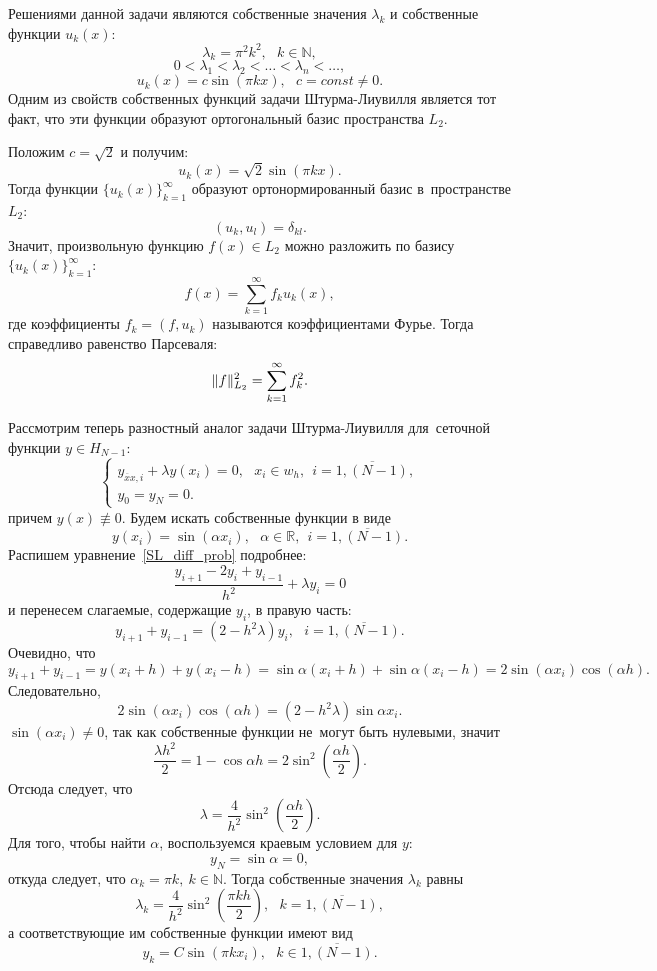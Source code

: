 \documentclass[11pt,a4paper,twoside]{report}
\numberwithin{equation}{section}
\theoremstyle{definition}
\theoremstyle{plain}
\DeclarePairedDelimiter\norm{\lVert}{\rVert}
\begin{document}
Решениями данной задачи являются собственные значения $\lambda_k$ и собственные
функции $u_k(x)$:
%
$$
    \lambda_k = \pi^2k^2, ~~~k\in\mathbb{N},
$$
%
$$
    0 < \lambda_1 < \lambda_2 < \ldots < \lambda_n < \ldots,
$$
%
$$
    u_k(x) = c \sin(\pi k x), ~~~c = const \neq 0.
$$
%
Одним из свойств собственных функций задачи Штурма-Лиувилля
является тот факт, что эти функции образуют ортогональный базис
пространства $L_2$.

Положим $c = \sqrt{2}$ и получим:
%
$$
    u_k(x) = \sqrt{2}\sin(\pi kx).
$$
%
Тогда функции $\{u_k(x)\}_{k=1}^{\infty}$ образуют ортонормированный
базис в~пространстве $L_2$:
%
$$
    (u_k, u_l) = \delta_{kl}.
$$
%
Значит, произвольную функцию $f(x) \in L_2$ можно разложить по базису
$\{u_k(x)\}_{k=1}^{\infty}$:
%
$$
    f(x) = \sum_{k=1}^{\infty} f_k u_k(x),
$$
%
где коэффициенты $f_k = (f,u_k)$ называются коэффициентами Фурье.
Тогда справедливо равенство Парсеваля:
%
$$
    \norm{f}_{L_2}^2 = \sum_{k=1}^{\infty} f_k^2.
$$
%

Рассмотрим теперь разностный аналог задачи Штурма-Лиувилля для~сеточной
функции $y\in H_{N-1}$:
%
\begin{equation}
%
    \begin{cases}
        \label{SL_diff_prob}
        y_{\overline{x}x,i} + \lambda y(x_i) = 0,
        ~~~x_i \in w_h, ~~i=\overline{1, (N-1)}, \\
        y_0 = y_N = 0.
    \end{cases}
%
\end{equation}
%
причем $y(x) \not\equiv 0.$
Будем искать собственные функции в виде
%
$$
    y(x_i) = \sin(\alpha x_i), ~~~\alpha\in\mathbb{R}, ~~i=\overline{1, (N-1)}.
$$
%
Распишем уравнение~\eqref{SL_diff_prob} подробнее:
%
$$
    \frac{y_{i+1} - 2y_i + y_{i-1}}{h^2} + \lambda y_i = 0
$$
%
и перенесем слагаемые, содержащие $y_i$, в правую часть:
%
$$
    y_{i+1} + y_{i-1} = \left(2 - h^2\lambda\right)y_i, ~~~i = \overline{1, (N-1)}.
$$
%
Очевидно, что
%
$$
    y_{i+1} + y_{i-1} = y(x_i + h) + y(x_i - h) = \sin\alpha(x_i + h) +
    \sin\alpha(x_i - h) = 2\sin(\alpha x_i) \cos(\alpha h).
$$
%
Следовательно,
%
$$
    2\sin(\alpha x_i) \cos(\alpha h) = (2 - h^2\lambda) \sin\alpha x_i.
$$
%
$\sin(\alpha x_i) \neq 0$, так как собственные функции
не~могут быть нулевыми, значит
%
$$
    \frac{\lambda h^2}{2} = 1 - \cos \alpha h =
    2 \sin^2\left(\frac{\alpha h}{2}\right).
$$
%
Отсюда следует, что
%
$$
    \lambda = \frac{4}{h^2} \sin^2 \left(\frac{\alpha h}{2}\right).
$$
%
Для того, чтобы найти $\alpha$, воспользуемся краевым условием для $y$:
%
$$
    y_N = \sin \alpha = 0,
$$
%
откуда следует, что $\alpha_k = \pi k, ~k\in\mathbb{N}$.
Тогда собственные значения $\lambda_k$ равны
%
$$
    \lambda_k = \frac{4}{h^2} \sin^2\left(\frac{\pi k h}{2}\right), ~~~k = \overline{1, (N-1)},
$$
%
а соответствующие им собственные функции имеют вид
%
$$
    y_k = C \sin(\pi k x_i), ~~~k \in \overline{1, (N-1)}.
$$
%
\end{document}
